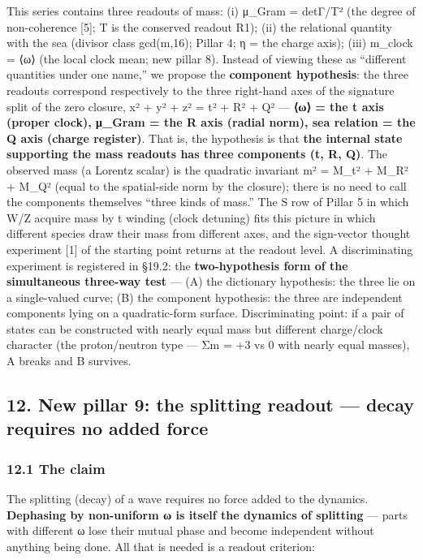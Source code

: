 \documentclass[
]{article}
\begin{document}
This series contains three readouts of mass: (i) μ\_Gram = detΓ/T² (the
degree of non-coherence {[}5{]}; T is the conserved readout R1); (ii)
the relational quantity with the sea (divisor class gcd(m,16); Pillar 4;
η = the charge axis); (iii) m\_clock = ⟨ω⟩ (the local clock mean; new
pillar 8). Instead of viewing these as ``different quantities under one
name,'' we propose the \textbf{component hypothesis}: the three readouts
correspond respectively to the three right-hand axes of the signature
split of the zero closure, x² + y² + z² = t² + R² + Q² --- \textbf{⟨ω⟩ =
the t axis (proper clock), μ\_Gram = the R axis (radial norm), sea
relation = the Q axis (charge register)}. That is, the hypothesis is
that \textbf{the internal state supporting the mass readouts has three
components (t, R, Q)}. The observed mass (a Lorentz scalar) is the
quadratic invariant m² = M\_t² + M\_R² + M\_Q² (equal to the
spatial-side norm by the closure); there is no need to call the
components themselves ``three kinds of mass.'' The S row of Pillar 5 in
which W/Z acquire mass by t winding (clock detuning) fits this picture
in which different species draw their mass from different axes, and the
sign-vector thought experiment {[}1{]} of the starting point returns at
the readout level. A discriminating experiment is registered in §19.2:
the \textbf{two-hypothesis form of the simultaneous three-way test} ---
(A) the dictionary hypothesis: the three lie on a single-valued curve;
(B) the component hypothesis: the three are independent components lying
on a quadratic-form surface. Discriminating point: if a pair of states
can be constructed with nearly equal mass but different charge/clock
character (the proton/neutron type --- Σm = +3 vs 0 with nearly equal
masses), A breaks and B survives.

\subsection{12. New pillar 9: the splitting readout --- decay requires
no added
force}\label{new-pillar-9-the-splitting-readout-decay-requires-no-added-force}

\subsubsection{12.1 The claim}\label{the-claim}

The splitting (decay) of a wave requires no force added to the dynamics.
\textbf{Dephasing by non-uniform ω is itself the dynamics of splitting}
--- parts with different ω lose their mutual phase and become
independent without anything being done. All that is needed is a readout
criterion:
\end{document}
